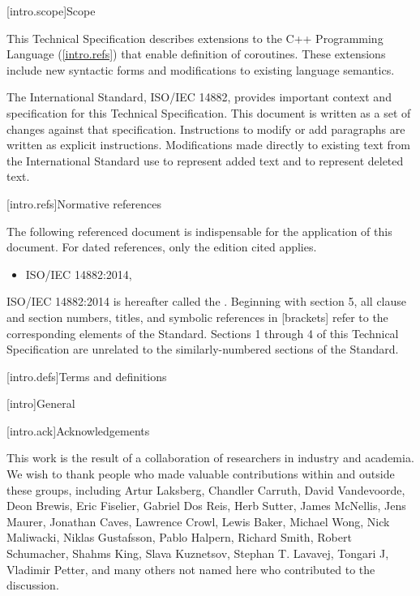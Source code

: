 
[intro.scope]{Scope}

\pnum
This Technical Specification describes extensions to the C++ 
Programming Language (\ref{intro.refs}) that
enable definition of coroutines. These extensions include 
new syntactic forms and modifications to existing language semantics.

\pnum
The International Standard, ISO/IEC 14882, provides important context
and specification for this Technical Specification. This document is 
written as a set of changes against that specification. Instructions
to modify or add paragraphs are written as explicit instructions. 
Modifications made directly to existing text from the International
Standard use  to represent added text and
 to represent deleted text. 

[intro.refs]{Normative references}

\pnum
The following referenced document is indispensable for the
application of this document. For dated references, only the
edition cited applies. 

\begin{itemize}
	\item ISO/IEC 14882:2014, 
\end{itemize}

ISO/IEC 14882:2014 is hereafter called the .
%
Beginning with section 5, all clause and section numbers, titles,
and symbolic references in [brackets] refer to the corresponding elements of the \Cpp Standard. Sections 1 through 4 of this Technical
Specification 
are unrelated to the similarly-numbered sections of the \Cpp Standard.


[intro.defs]{Terms and definitions}


[intro]{General}

[intro.ack]{Acknowledgements}

This work is the result of a collaboration of researchers in industry and academia. We wish to thank people who made valuable contributions within and outside these groups, including
Artur Laksberg,
Chandler Carruth,
David Vandevoorde,
Deon Brewis,
Eric Fiselier,
Gabriel Dos Reis,
Herb Sutter,
James McNellis,
Jens Maurer,
Jonathan Caves,
Lawrence Crowl,
Lewis Baker,
Michael Wong,
Nick Maliwacki,
Niklas Gustafsson,
Pablo Halpern,
Richard Smith,
Robert Schumacher,
Shahms King,
Slava Kuznetsov,
Stephan T. Lavavej,
Tongari J,
Vladimir Petter,
and many others not named here who contributed to
the discussion.

